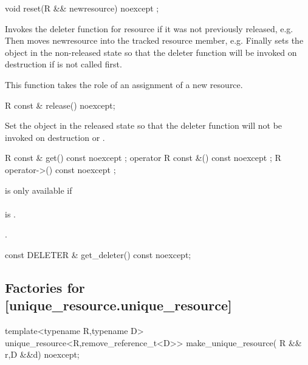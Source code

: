 \documentclass[ebook,11pt,article]{memoir}
\begin{document}
\begin{itemdecl}
void reset(R && newresource) noexcept ;
\end{itemdecl}

\pnum
\effects Invokes the deleter function for resource if it was not previously released, e.g.   Then moves newresource into the tracked resource member, e.g.   Finally sets the object in the non-released state so that the deleter function will be invoked on destruction if  is not called first.

\pnum
\enternote This function takes the role of an assignment of a new resource.
\exitnote

\begin{itemdecl}
R const & release() noexcept;
\end{itemdecl}

\pnum
\effects Set the object in the released state so that the deleter function will not be invoked on destruction or .

\pnum
\returns {}


\begin{itemdecl}
R const & get() const noexcept ;
operator  R const &() const noexcept ;
R operator->() const noexcept ;
\end{itemdecl}

\pnum
\requires {} is only available if \\
\\ is . 

\pnum
\returns {}.

\begin{itemdecl}
const DELETER & get_deleter() const noexcept;
\end{itemdecl}

\pnum
\returns {}

\subsection {Factories for  [unique_resource.unique_resource]}
\begin{itemdecl}
template<typename R,typename D>
unique_resource<R,remove_reference_t<D>>
make_unique_resource( R && r,D &&d) noexcept;
\end{itemdecl}
\end{document}
